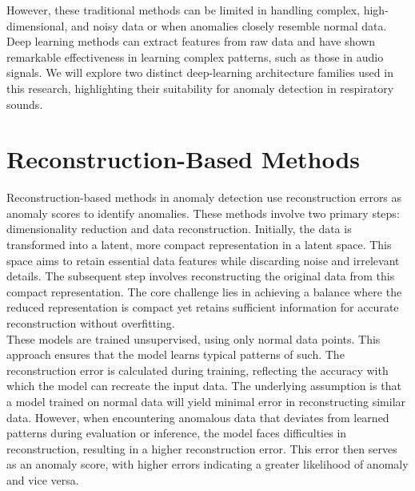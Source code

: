 However, these traditional methods can be limited in handling complex, high-dimensional, and noisy data or when anomalies closely resemble normal data. Deep learning methods can extract features from raw data and have shown remarkable effectiveness in learning complex patterns, such as those in audio signals. We will explore two distinct deep-learning architecture families used in this research, highlighting their suitability for anomaly detection in respiratory sounds.

\section{Reconstruction-Based Methods}
Reconstruction-based methods in anomaly detection use reconstruction errors as anomaly scores to identify anomalies. These methods involve two primary steps: dimensionality reduction and data reconstruction. Initially, the data is transformed into a latent, more compact representation in a latent space. This space aims to retain essential data features while discarding noise and irrelevant details. The subsequent step involves reconstructing the original data from this compact representation. The core challenge lies in achieving a balance where the reduced representation is compact yet retains sufficient information for accurate reconstruction without overfitting.\\
These models are trained unsupervised, using only normal data points. This approach ensures that the model learns typical patterns of such. The reconstruction error is calculated during training, reflecting the accuracy with which the model can recreate the input data. The underlying assumption is that a model trained on normal data will yield minimal error in reconstructing similar data. However, when encountering anomalous data that deviates from learned patterns during evaluation or inference, the model faces difficulties in reconstruction, resulting in a higher reconstruction error. This error then serves as an anomaly score, with higher errors indicating a greater likelihood of anomaly and vice versa.

